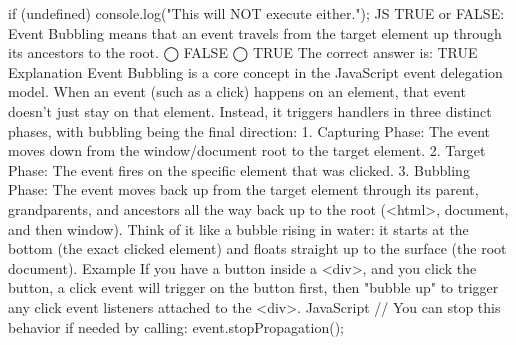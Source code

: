 if (undefined) {
  console.log("This will NOT execute either.");
}
JS
TRUE or FALSE: Event Bubbling means that an event travels from the target element up through its ancestors to the root.
◯ FALSE
◯ TRUE
The correct answer is:
TRUE
Explanation
Event Bubbling is a core concept in the JavaScript event delegation model. When an event (such as a click) happens on an element, that event doesn't just stay on that element. Instead, it triggers handlers in three distinct phases, with bubbling being the final direction:
1.	Capturing Phase: The event moves down from the window/document root to the target element.
2.	Target Phase: The event fires on the specific element that was clicked.
3.	Bubbling Phase: The event moves back up from the target element through its parent, grandparents, and ancestors all the way back up to the root (<html>, document, and then window).
Think of it like a bubble rising in water: it starts at the bottom (the exact clicked element) and floats straight up to the surface (the root document).
Example
If you have a button inside a <div>, and you click the button, a click event will trigger on the button first, then "bubble up" to trigger any click event listeners attached to the <div>.
JavaScript
// You can stop this behavior if needed by calling:
event.stopPropagation();

